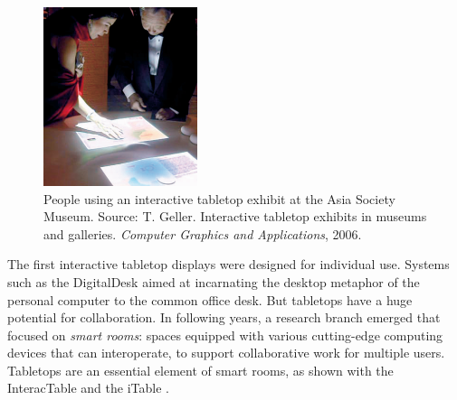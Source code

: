 \begin{figure}[htb]
  \centering
    \includegraphics[width=0.4\textwidth]{images/visitors}
  \caption{People using an interactive tabletop exhibit at the Asia Society Museum. Source: T. Geller. Interactive tabletop exhibits in museums and galleries. \emph{Computer Graphics and Applications}, 2006.}
  \label{fig:visitors}
\end{figure}

The first interactive tabletop displays were designed for individual use.
Systems such as the DigitalDesk \citep{Wellner:1993:digitaldesk} aimed at incarnating the desktop metaphor of the personal computer to the common office desk.
But tabletops have a huge potential for collaboration.
In following years, a research branch emerged that focused on \emph{smart rooms}: spaces equipped with various cutting-edge computing devices that can interoperate, to support collaborative work for multiple users.
Tabletops are an essential element of smart rooms, as shown with the InteracTable \citep{Streitz:1999:iland} and the iTable \citep{Johanson:2002:iroom}.

